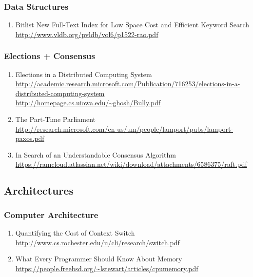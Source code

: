 \documentclass{article}
\begin{document}
\subsubsection{Data Structures}
\begin{enumerate}
\item {Bitlist New Full-Text Index for Low Space Cost and Efficient Keyword Search\\
\url{http://www.vldb.org/pvldb/vol6/p1522-rao.pdf}}
\end{enumerate}

\subsubsection{Elections + Consensus}
\begin{enumerate}
	\item {Elections in a Distributed Computing System\\
\href{http://academic.research.microsoft.com/Publication/716253/elections-in-a-distributed-computing-system}{http://academic.research.microsoft.com/Publication/716253/elections-in-a-distributed-computing-system}\\
\url{http://homepage.cs.uiowa.edu/~ghosh/Bully.pdf}}
	\item {The Part-Time Parliament\\
\href{http://research.microsoft.com/en-us/um/people/lamport/pubs/lamport-paxos.pdf}{http://research.microsoft.com/en-us/um/people/lamport/pubs/lamport-paxos.pdf}}
	\item {In Search of an Understandable Consensus Algorithm\\
\href{https://ramcloud.atlassian.net/wiki/download/attachments/6586375/raft.pdf}{https://ramcloud.atlassian.net/wiki/download/attachments/6586375/raft.pdf}}
\end{enumerate}


\subsection{Architectures}

\subsubsection{Computer Architecture}
\begin{enumerate}
	\item {Quantifying the Cost of Context Switch\\
\url{http://www.cs.rochester.edu/u/cli/research/switch.pdf}}
	\item {What Every Programmer Should Know About Memory\\
\url{https://people.freebsd.org/~lstewart/articles/cpumemory.pdf}}
\end{enumerate}
\end{document}
